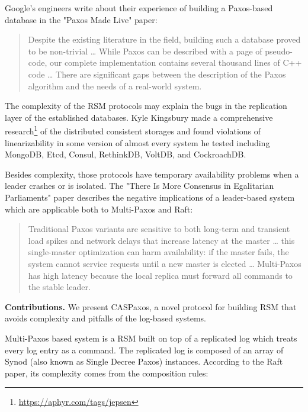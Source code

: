 \documentclass[12pt]{article}
\theoremstyle{definition}
\begin{document}
Google's engineers write about their experience of building a Paxos-based database in the "Paxos Made Live"\cite{chubby} paper:

\begin{quote}
Despite the existing literature in the field, building such a database proved to be non-trivial \ldots{} While Paxos can be described with a page of pseudo-code, our complete implementation contains several thousand lines of C++ code \ldots{} There are significant gaps between the description of the Paxos algorithm and the needs of a real-world system.
\end{quote}

The complexity of the RSM protocols may explain the bugs in the replication layer of the established databases. Kyle Kingsbury made a comprehensive research\footnote{\href{https://aphyr.com/tags/jepsen}{https://aphyr.com/tags/jepsen}} of the distributed consistent storages and found violations of linearizability in some version of almost every system he tested including MongoDB, Etcd, Consul, RethinkDB, VoltDB, and CockroachDB.

Besides complexity, those protocols have temporary availability problems when a leader crashes or is isolated. The "There Is More Consensus in Egalitarian Parliaments" paper\cite{epaxos} describes the negative implications of a leader-based system which are applicable both to Multi-Paxos and Raft:

\begin{quote}
Traditional Paxos variants are sensitive to both long-term and transient load spikes and network delays that increase latency at the master \ldots{} this single-master optimization can harm availability: if the master fails, the system cannot service requests until a new master is elected \ldots{} Multi-Paxos has high latency because the local replica must forward all commands to the stable leader.
\end{quote}

{\bf Contributions.} We present CASPaxos, a novel protocol for building RSM that avoids complexity and pitfalls of the log-based systems.

Multi-Paxos based system is a RSM built on top of a replicated log which treats every log entry as a command. The replicated log is composed of an array of Synod\cite{lamport01} (also known as Single Decree Paxos) instances. According to the Raft paper, its complexity comes from the composition rules:
\end{document}
